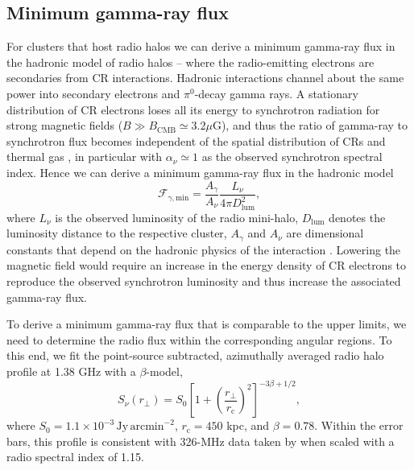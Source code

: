 \documentclass[12pt,manuscript]{aastex}
\newcommand{\rmn}{\mathrm}
\newcommand{\dps}{\displaystyle}
\begin{document}
\subsection{Minimum gamma-ray flux}
\label{sec:Fmin}
For clusters that host radio halos we can derive a minimum gamma-ray flux in the hadronic
model of radio halos -- where the radio-emitting electrons are secondaries from CR interactions. 
Hadronic interactions channel about the same power into secondary electrons and $\pi^{0}$-decay
gamma rays. A stationary distribution of CR electrons loses all its energy to
synchrotron radiation for strong magnetic fields ($B \gg B_{\rmn{CMB}} \simeq 3.2 \mu$G), and thus the
ratio of gamma-ray to synchrotron flux becomes independent of the spatial distribution of CRs and
thermal gas \citep{article:Voelk:1989, article:Pohl:1994, article:Pfrommer:2008}, in particular with
$\alpha_{\nu}\simeq 1$ as the observed synchrotron spectral index.  Hence we can derive a minimum
gamma-ray flux in the hadronic model
\begin{equation}
\label{eq:Fmin}
\mathcal{F}_{\gamma,\rmn{min}} = \frac{\dps A_{\gamma}}{\dps A_{\nu}}\frac{\dps L_{\nu}}{\dps 4\pi D_{\rmn{lum}}^{2}},
\end{equation}
where $L_{\nu}$ is the observed luminosity of the radio mini-halo, $D_{\rmn{lum}}$ denotes the
luminosity distance to the respective cluster, $A_\gamma$ and $A_\nu$ are dimensional constants
that depend on the hadronic physics of the interaction \citep{article:Pfrommer:2008,
Pfrommer_etal:2008}. Lowering the magnetic field would require an increase in the energy density of
CR electrons to reproduce the observed synchrotron luminosity and thus increase the associated
gamma-ray flux.

To derive a minimum gamma-ray flux that is comparable to the upper limits, we need to determine the
radio flux within the corresponding angular regions. To this end, we fit the point-source
subtracted, azimuthally averaged radio halo profile at 1.38 GHz \citep{article:Deiss_etal:1997}
with a $\beta$-model,
\begin{equation}
\label{beta}
 S_{\nu} (r_{\bot})= S_{0} \left[ 1 + \left( \frac{r_{\bot}}{r_{\rmn{c}}}\right)^{2}\right]^{-3\beta + 1/2},
\end{equation}
where $S_{0} = 1.1 \times 10^{-3}\,\rmn{Jy\,arcmin}^{-2}$, $r_{\rmn{c}} = 450$ kpc, and
$\beta = 0.78$.  Within the error bars, this profile is consistent with 326-MHz data taken by
\citet{article:Govoni_etal:2001} when scaled with a radio spectral index of 1.15. 
\end{document}
